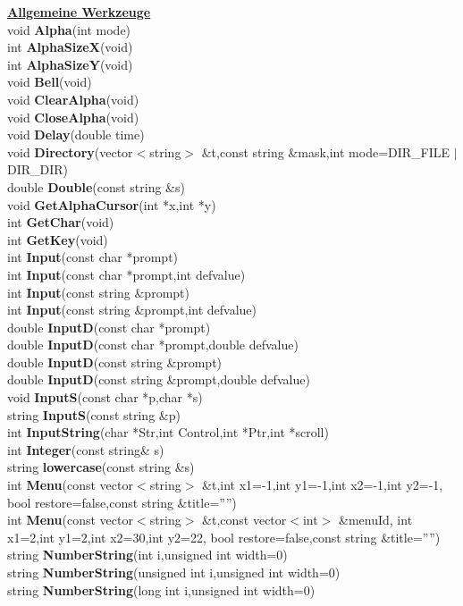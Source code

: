 \documentclass[10pt,titlepage]{article}
\newcommand{\subtitle}[1]{{\noindent\bf#1}}
\def\functionlistentry#1#2#3#4#5#6{\noindent #1 {\bf #2}(#3) \dotfill #6\\}
\begin{document}
{{\subtitle{\hyperlink{SECTION:genericTools}{Allgemeine Werkzeuge}}\\
\functionlistentry{void}{Alpha}{int mode}{1418}{genericTools}{}
\functionlistentry{int}{AlphaSizeX}{void}{1425}{genericTools}{}
\functionlistentry{int}{AlphaSizeY}{void}{1426}{genericTools}{}
\functionlistentry{void}{Bell}{void}{1424}{genericTools}{}
\functionlistentry{void}{ClearAlpha}{void}{1421}{genericTools}{}
\functionlistentry{void}{CloseAlpha}{void}{1417}{genericTools}{}
\functionlistentry{void}{Delay}{double time}{1445}{genericTools}{}
\functionlistentry{void}{Directory}{vector$<$string$>$ \&t,const string \&mask,int mode=DIR\_FILE $|$ DIR\_DIR}{1446}{genericTools}{}
\functionlistentry{double}{Double}{const string \&s}{1410}{genericTools}{}
\functionlistentry{void}{GetAlphaCursor}{int *x,int *y}{1423}{genericTools}{}
\functionlistentry{int}{GetChar}{void}{1429}{genericTools}{}
\functionlistentry{int}{GetKey}{void}{1430}{genericTools}{}
\functionlistentry{int}{Input}{const char *prompt}{1433}{genericTools}{}
\functionlistentry{int}{Input}{const char *prompt,int defvalue}{1434}{genericTools}{}
\functionlistentry{int}{Input}{const string \&prompt}{1435}{genericTools}{}
\functionlistentry{int}{Input}{const string \&prompt,int defvalue}{1436}{genericTools}{}
\functionlistentry{double}{InputD}{const char *prompt}{1437}{genericTools}{}
\functionlistentry{double}{InputD}{const char *prompt,double defvalue}{1438}{genericTools}{}
\functionlistentry{double}{InputD}{const string \&prompt}{1439}{genericTools}{}
\functionlistentry{double}{InputD}{const string \&prompt,double defvalue}{1440}{genericTools}{}
\functionlistentry{void}{InputS}{const char *p,char *s}{1441}{genericTools}{}
\functionlistentry{string}{InputS}{const string \&p}{1442}{genericTools}{}
\functionlistentry{int}{InputString}{char *Str,int Control,int *Ptr,int *scroll}{1443}{genericTools}{}
\functionlistentry{int}{Integer}{const string\& s}{1409}{genericTools}{}
\functionlistentry{string}{lowercase}{const string \&s}{1411}{genericTools}{}
\functionlistentry{int}{Menu}{const vector$<$string$>$ \&t,int x1=-1,int y1=-1,int x2=-1,int y2=-1, bool restore=false,const string \&title=''''}{1447}{genericTools}{}
\functionlistentry{int}{Menu}{const vector$<$string$>$ \&t,const vector$<$int$>$ \&menuId, int x1=2,int y1=2,int x2=30,int y2=22, bool restore=false,const string \&title=''''}{1448}{genericTools}{}
\functionlistentry{string}{NumberString}{int i,unsigned int width=0}{1404}{genericTools}{}
\functionlistentry{string}{NumberString}{unsigned int i,unsigned int width=0}{1405}{genericTools}{}
\functionlistentry{string}{NumberString}{long int i,unsigned int width=0}{1406}{genericTools}{}
}}
\end{document}
